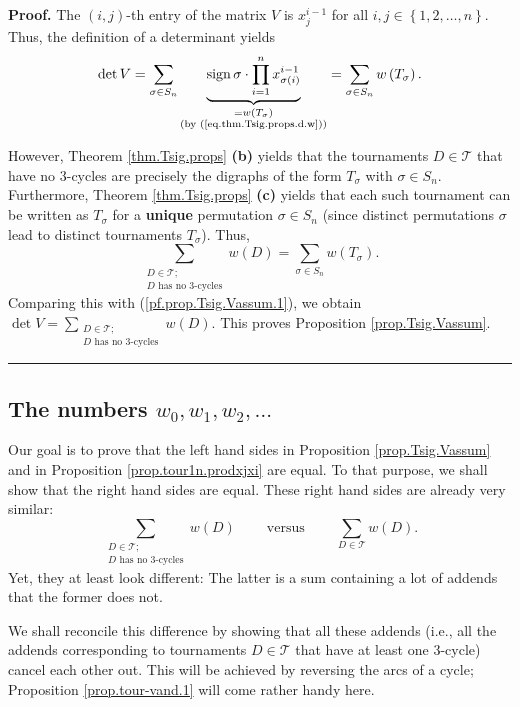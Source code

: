 \documentclass[numbers=enddot,12pt,final,onecolumn,notitlepage]{scrartcl}%
\numberwithin{exer}{subsection}
\theoremstyle{definition}
\newenvironment{proof}[1][Proof]{\noindent\textbf{#1.} }{\ \rule{0.5em}{0.5em}}
\let\sumnonlimits\sum
\let\prodnonlimits\prod
\renewcommand{\sum}{\sumnonlimits\limits}
\renewcommand{\prod}{\prodnonlimits\limits}
\begin{document}
\begin{proof}
The $\left(  i,j\right)  $-th entry of the matrix $V$ is $x_{j}^{i-1}$ for all
$i,j\in\left\{  1,2,\ldots,n\right\}  $. Thus, the definition of a determinant
yields%
\begin{equation}
\det V=\sum_{\sigma\in S_{n}}\underbrace{\operatorname*{sign}\sigma\cdot
\prod_{i=1}^{n}x_{\sigma\left(  i\right)  }^{i-1}}_{\substack{=w\left(
T_{\sigma}\right)  \\\text{(by (\ref{eq.thm.Tsig.props.d.w}))}}}=\sum
_{\sigma\in S_{n}}w\left(  T_{\sigma}\right)  . \label{pf.prop.Tsig.Vassum.1}%
\end{equation}


However, Theorem \ref{thm.Tsig.props} \textbf{(b)} yields that the tournaments
$D\in\mathcal{T}$ that have no $3$-cycles are precisely the digraphs of the
form $T_{\sigma}$ with $\sigma\in S_{n}$. Furthermore, Theorem
\ref{thm.Tsig.props} \textbf{(c)} yields that each such tournament can be
written as $T_{\sigma}$ for a \textbf{unique} permutation $\sigma\in S_{n}$
(since distinct permutations $\sigma$ lead to distinct tournaments $T_{\sigma
}$). Thus,%
\[
\sum_{\substack{D\in\mathcal{T};\\D\text{ has no }3\text{-cycles}}}w\left(
D\right)  =\sum_{\sigma\in S_{n}}w\left(  T_{\sigma}\right)  .
\]
Comparing this with (\ref{pf.prop.Tsig.Vassum.1}), we obtain $\det
V=\sum_{\substack{D\in\mathcal{T};\\D\text{ has no }3\text{-cycles}}}w\left(
D\right)  $. This proves Proposition \ref{prop.Tsig.Vassum}.
\end{proof}

\subsection{The numbers $w_{0},w_{1},w_{2},\ldots$}

Our goal is to prove that the left hand sides in Proposition
\ref{prop.Tsig.Vassum} and in Proposition \ref{prop.tour1n.prodxjxi} are
equal. To that purpose, we shall show that the right hand sides are equal.
These right hand sides are already very similar:%
\[
\sum_{\substack{D\in\mathcal{T};\\D\text{ has no }3\text{-cycles}}}w\left(
D\right)  \ \ \ \ \ \ \ \ \ \ \text{versus}\ \ \ \ \ \ \ \ \ \ \sum
_{D\in\mathcal{T}}w\left(  D\right)  .
\]
Yet, they at least look different: The latter is a sum containing a lot of
addends that the former does not.

We shall reconcile this difference by showing that all these addends (i.e.,
all the addends corresponding to tournaments $D\in\mathcal{T}$ that have at
least one $3$-cycle) cancel each other out. This will be achieved by reversing
the arcs of a cycle; Proposition \ref{prop.tour-vand.1} will come rather handy here.
\end{document}
